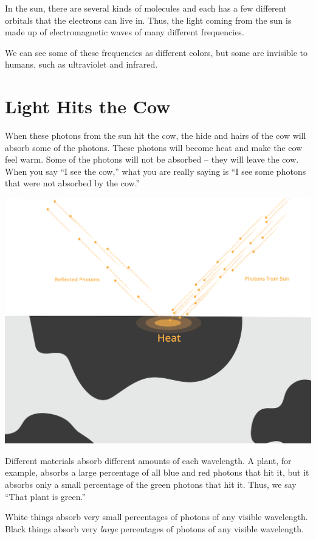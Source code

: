 In the sun, there are several kinds of molecules and each has a few
different orbitals that the electrons can live in.  Thus, the light
coming from the sun is made up of electromagnetic waves of many
different frequencies.

We can see some of these frequencies as different colors, but some are
invisible to humans, such as ultraviolet and infrared.

\section{Light Hits the Cow}


When these photons from the sun hit the cow, the hide and hairs of the
cow will absorb some of the photons. These photons will become heat
and make the cow feel warm.  Some of the photons will not be absorbed
-- they will leave the cow.  When you say ``I see the cow,'' what you are
really saying is ``I see some photons that were not absorbed by the cow.''

\includegraphics[width=1\textwidth]{cow4.png}


Different materials absorb different amounts of each wavelength. A
plant, for example, absorbs a large percentage of all blue and red
photons that hit it, but it absorbs only a small percentage of the
green photons that hit it.  Thus, we say ``That plant is green.''

White things absorb very small percentages of photons of any visible
wavelength.  Black things absorb very \emph{large} percentages of
photons of any visible wavelength.

